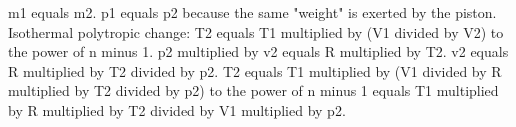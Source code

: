 m1 equals m2.  
p1 equals p2 because the same "weight" is exerted by the piston.  
Isothermal polytropic change:  
T2 equals T1 multiplied by (V1 divided by V2) to the power of n minus 1.  
p2 multiplied by v2 equals R multiplied by T2.  
v2 equals R multiplied by T2 divided by p2.  
T2 equals T1 multiplied by (V1 divided by R multiplied by T2 divided by p2) to the power of n minus 1 equals T1 multiplied by R multiplied by T2 divided by V1 multiplied by p2.